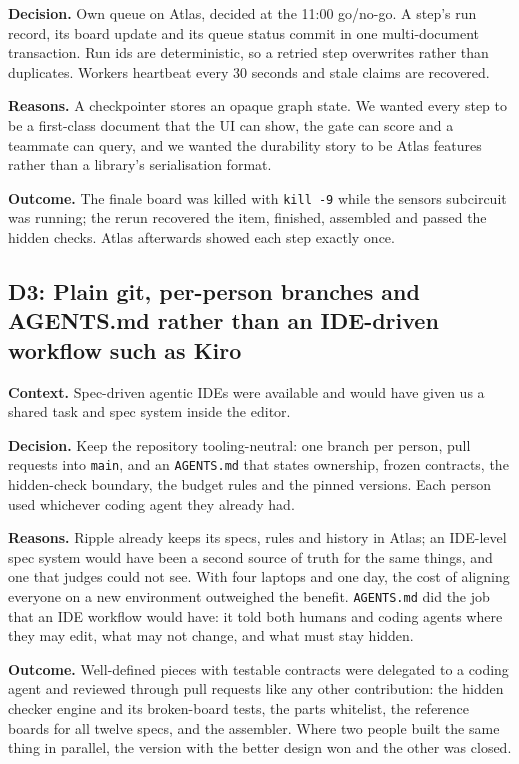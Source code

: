 \documentclass[11pt,a4paper]{article}
\newcommand{\code}[1]{\texttt{#1}}
\begin{document}
\textbf{Decision.} Own queue on Atlas, decided at the 11:00 go/no-go. A step's run record, its board update and its queue status commit in one multi-document transaction. Run ids are deterministic, so a retried step overwrites rather than duplicates. Workers heartbeat every 30 seconds and stale claims are recovered.

\textbf{Reasons.} A checkpointer stores an opaque graph state. We wanted every step to be a first-class document that the UI can show, the gate can score and a teammate can query, and we wanted the durability story to be Atlas features rather than a library's serialisation format.

\textbf{Outcome.} The finale board was killed with \code{kill -9} while the sensors subcircuit was running; the rerun recovered the item, finished, assembled and passed the hidden checks. Atlas afterwards showed each step exactly once.

\subsection{D3: Plain git, per-person branches and AGENTS.md rather than an IDE-driven workflow such as Kiro}

\textbf{Context.} Spec-driven agentic IDEs were available and would have given us a shared task and spec system inside the editor.

\textbf{Decision.} Keep the repository tooling-neutral: one branch per person, pull requests into \code{main}, and an \code{AGENTS.md} that states ownership, frozen contracts, the hidden-check boundary, the budget rules and the pinned versions. Each person used whichever coding agent they already had.

\textbf{Reasons.} Ripple already keeps its specs, rules and history in Atlas; an IDE-level spec system would have been a second source of truth for the same things, and one that judges could not see. With four laptops and one day, the cost of aligning everyone on a new environment outweighed the benefit. \code{AGENTS.md} did the job that an IDE workflow would have: it told both humans and coding agents where they may edit, what may not change, and what must stay hidden.

\textbf{Outcome.} Well-defined pieces with testable contracts were delegated to a coding agent and reviewed through pull requests like any other contribution: the hidden checker engine and its broken-board tests, the parts whitelist, the reference boards for all twelve specs, and the assembler. Where two people built the same thing in parallel, the version with the better design won and the other was closed.
\end{document}
